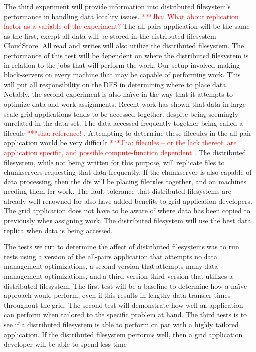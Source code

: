 \documentclass[a4paper,11pt]{article} \usepackage[utf8]{inputenc}
\newcommand{\jhanote}[1]{ {\textcolor{red} { ***Jha: #1 }}}
\newcommand{\yyenote}[1]{ {\textcolor{blue} { ***yye00: #1 }}} \else
\newcommand{\jhanote}[1]{} \newcommand{\yyenote}[1]{}
\begin{document}
The third experiment will provide information into distributed
filesystem's performance in handling data locality issues.
\jhanote{What about replication factor as a variable of the experiment?}
The all-pairs application will be the same as the first, except all data
will be stored in the distributed filesystem CloudStore.  All read and
writes will also utilize the distributed filesystem.  The performance of
this test will be dependent on where the distributed filesystem is in
relation to the jobs that will perform the work.  Our setup involved
making block-servers on every machine that may be capable of performing
work.  This will put all responsibility on the DFS in determining where
to place data.  Notably, the second experiment is also naïve in the way
that it attempts to optimize data and work assignments.  Recent work has
shown that data in large scale grid applications tends to be accessed
together, despite being seemingly unrelated in the data set.  The data
accessed frequently together being called a filecule
\jhanote{reference!}.  Attempting to determine these filecules in the
all-pair application would be very difficult \jhanote{filecules -- or
the lack thereof, are application specific, and possible
compute-function dependent}. The distributed filesystem, while not being
written for this purpose, will replicate files to chunkservers
requesting that data frequently.  If the chunkserver is also capable of
data processing, then the dfs will be placing filecules together, and on
machines needing them for work.  The fault tolerance that distributed
filesystems are already well renowned for also have added benefits to
grid application developers.  The grid application does not have to be
aware of where data has been copied to previously when assigning work.
The distributed filesystem will use the best data replica when data is
being accessed.

The tests we run to determine the affect of distributed filesystems was
to run tests using a version of the all-pairs application that attempts
no data management optimizations, a second version that attempts many
data management optimizations, and a third version third version that
utilizes a distributed filesystem.  The first test will be a baseline to
determine how a naïve approach would perform, even if this results in
lengthy data transfer times throughout the grid.  The second test will
demonstrate how well an application can perform when tailored to the
specific problem at hand.  The third tests is to see if a distributed
filesystem is able to perform on par with a highly tailored application.
If the distributed filesystem performs well, then a grid application
developer will be able to spend less time 
\end{document}

